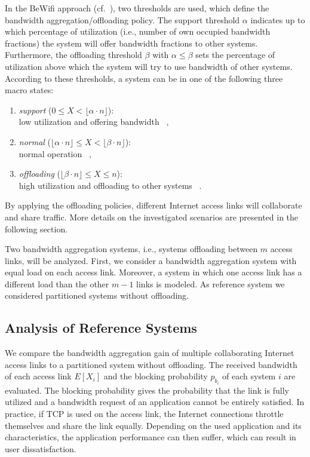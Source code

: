 In the BeWifi approach (cf.~), two thresholds are used, which define the bandwidth aggregation/offloading policy. The support threshold $\alpha$ indicates up to which percentage of utilization (i.e., number of own occupied bandwidth fractions) the system will offer bandwidth fractions to other systems. Furthermore, the offloading threshold $\beta$ with $\alpha\leq\beta$ sets the percentage of utilization above which the system will try to use bandwidth of other systems. According to these thresholds, a system can be in one of the following three macro states:

\begin{enumerate}
	\item \textit{support} ($0 \leq X < \lfloor\alpha\cdot n\rfloor$):\\ low utilization and offering bandwidth \, ,
	\item \textit{normal} ($\lfloor\alpha\cdot n\rfloor \leq X < \lfloor\beta\cdot n\rfloor$):\\ normal operation \, ,
	\item \textit{offloading} ($\lfloor\beta\cdot n\rfloor \leq X \leq n$):\\ high utilization and offloading to other systems \, .
\end{enumerate}

By applying the offloading policies, different Internet access links will collaborate and share traffic. More details on the investigated scenarios are presented in the following section.

Two bandwidth aggregation systems, i.e., systems offloading between $m$ access links, will be analyzed. First, we consider a bandwidth aggregation system with equal load on each access link. Moreover, a system in which one access link has a different load than the other $m-1$ links is modeled. As reference system we considered partitioned systems without offloading.%

\subsection{Analysis of Reference Systems}

We compare the bandwidth aggregation gain of multiple collaborating Internet access links to a partitioned system without offloading. %
The received bandwidth of each access link $E[X_i]$ and the blocking probability $p_{b_i}$ of each system $i$ are evaluated. The blocking probability gives the probability that the link is fully utilized and a bandwidth request of an application cannot be entirely satisfied. In practice, if TCP is used on the access link, the Internet connections throttle themselves and share the link equally. Depending on the used application and its characteristics, the application performance can then suffer, which can result in user dissatisfaction.

